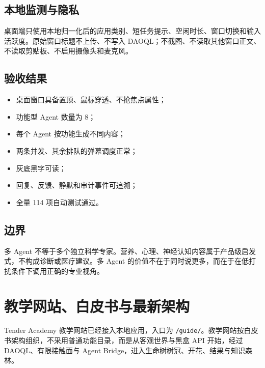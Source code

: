 \documentclass[UTF8,a4paper,11pt]{ctexart}
\begin{document}
\subsection{本地监测与隐私}

桌面端只使用本地归一化后的应用类别、短任务提示、空闲时长、窗口切换和输入活跃度。原始窗口标题不上传、不写入 DAOQL；不截图、不读取其他窗口正文、不读取剪贴板、不启用摄像头和麦克风。

\subsection{验收结果}

\begin{itemize}[leftmargin=2em]
\item 桌面窗口具备置顶、鼠标穿透、不抢焦点属性；
\item 功能型 Agent 数量为 8；
\item 每个 Agent 按功能生成不同内容；
\item 两条并发、其余排队的弹幕调度正常；
\item 灰底黑字可读；
\item 回复、反馈、静默和审计事件可追溯；
\item 全量 114 项自动测试通过。
\end{itemize}

\subsection{边界}

多 Agent 不等于多个独立科学专家。营养、心理、神经认知内容属于产品级启发式，不构成诊断或医疗建议。多 Agent 的价值不在于同时说更多，而在于在低打扰条件下调用正确的专业视角。

\section{教学网站、白皮书与最新架构}

Tender Academy 教学网站已经接入本地应用，入口为 \texttt{/guide/}。教学网站按白皮书架构组织，不采用普通功能目录，而是从客观世界与黑盒 API 开始，经过 DAOQL、有限接触面与 Agent Bridge，进入生命树树冠、开花、结果与知识森林。
\end{document}
